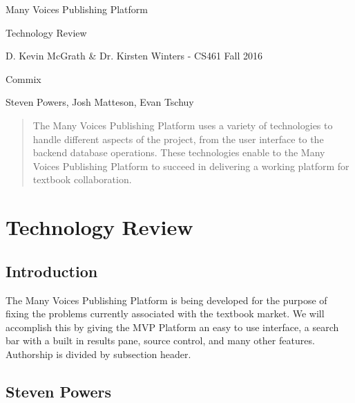 \documentclass[letterpaper, 10pt, draftclsnofoot, compsoc, onecolumn]{IEEEtran}
\begin{document}
\begin{titlepage}
\centering
{\huge Many Voices Publishing Platform\par}
{\LARGE Technology Review\par}
{\vspace{5mm}}
{\large D. Kevin McGrath \& Dr. Kirsten Winters -  CS461 Fall 2016\par}
{\large Commix\par}
{\large Steven Powers, Josh Matteson, Evan Tschuy\par}
{\vspace{10mm}}

\begin{abstract}
\noindent The Many Voices Publishing Platform uses a variety of technologies to handle different aspects of the project, from the user interface to the backend database operations. These technologies enable to the Many Voices Publishing Platform to succeed in delivering a working platform for textbook collaboration.
\end{abstract}

\end{titlepage}

\tableofcontents

\newpage

\setcounter{page}{1}\pagestyle{fancy}

\vspace{1pc}
\section{Technology Review}

\vspace{1pc}
\subsection{Introduction}
\vspace{1pc}

{\noindent The Many Voices Publishing Platform is being developed for the purpose of fixing the problems currently associated with the textbook market. We will accomplish this by giving the MVP Platform an easy to use interface, a search bar with a built in results pane, source control, and many other features. Authorship is divided by subsection header.\par}




\subsection{Steven Powers}
\vspace{1pc}
\end{document}
